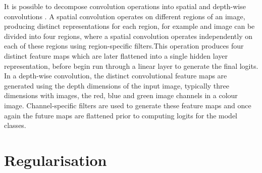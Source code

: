 It is possible to decompose convolution operations into spatial and depth-wise convolutions \cite{reference}. A spatial convolution operates on different regions of an image, producing distinct representations for each region, for example and image can be divided into four regions, where a spatial convolution operates independently on each of these regions using region-specific filters.This operation produces four distinct feature maps which are later flattened into a single hidden layer representation, before begin run through a linear layer to generate the final logits. In a depth-wise convolution, the distinct convolutional feature maps are generated using the depth dimensions of the input image, typically three dimensions with images, the red, blue and green image channels in a colour image. Channel-specific filters are used to generate these feature maps and once again the future maps are flattened prior to computing logits for the model classes. \newline



\section{Regularisation}

